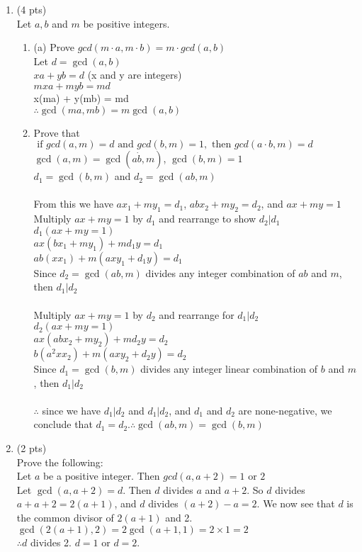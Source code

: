 \documentclass[12pt]{article}
\begin{document}
\begin{enumerate}
\item (4 pts) \\
Let \(a,b\) and \(m\) be positive integers.
\begin{enumerate}
	\item (a) Prove \(gcd(m \cdot a, m \cdot b) = m \cdot gcd(a,b)\)
    \\Let $d = \gcd(a,b)$
    \\$xa + yb = d$ (x and y are integers)
    \\$mxa + myb = md$
    \\x(ma) + y(mb) = md
    \\$\therefore \gcd(ma,mb) = m\gcd(a,b)$
	\item  Prove that \(\text{ if } gcd(a,m)=d \text{ and } gcd(b,m)=1, \text{ then } gcd(a \cdot b, m) = d\)
    \\$\gcd(a,m)=\gcd(a\dot b,m)$, $\gcd(b,m)=1$
    \\$d_{1} = \gcd(b,m)$ and $d_{2} = \gcd(ab,m)$\\
    \\From this we have $ax_{1} + my_{1} = d_{1}$, $abx_{2} + my_{2} = d_{2}$, and $ax+ my = 1$
    \\Multiply $ax+ my = 1$ by $d_{1}$ and rearrange to show $d_{2}|d_{1}$
    \\$d_{1}(ax+my=1)$
    \\$ax(bx_{1} + my_{1}) + md_{1}y=d_{1}$
    \\$ab(xx_{1}) + m(axy_{1} + d_{1}y)=d_{1}$
    \\Since $d_{2} = \gcd(ab,m)$ divides any integer combination of $ab$ and $m$, then $d_{1}|d_{2}$\\
    \\Multiply $ax + my = 1$ by $d_{2}$ and rearrange for $d_{1}|d_{2}$
    \\$d_{2}(ax + my = 1)$
    \\$ax(abx_{2} + my_{2}) + md_{2}y = d_{2}$
    \\$b(a^2xx_{2}) + m(axy_{2} + d_{2}y) = d_{2}$
    \\Since $d_{1}=\gcd(b,m)$ divides any integer linear combination of $b$ and $m$, then
    $d_{1}|d_{2}$\\
    \\$\therefore$ since we have $d_{1}|d_{2}$ and $d_{1}|d_{2}$, and $d_{1}$ and $d_{2}$ are none-negative, we conclude that $d_{1}=d_{2}$.$\therefore \gcd(ab,m) = \gcd(b,m)$
\end{enumerate}


\item (2 pts) \\
Prove the following:
\leavevmode\\\relax
Let \(a\) be a positive integer. Then \(gcd(a,a+2)=1 \text{ or } 2\)
\\Let $\gcd(a,a+2)=d$. Then $d$ divides $a$ and $a+2$. So $d$ divides $a + a + 2 = 2(a+1)$, and $d$ divides $(a+2)-a=2$. We now see that $d$ is the common divisor of $2(a+1)$ and 2.
\\$\gcd(2(a+1),2)=2\gcd(a+1,1)=2\times 1 = 2$
\\$\therefore d$ divides 2. $d=1$ or $d=2$.


\end{enumerate}
\end{document}
